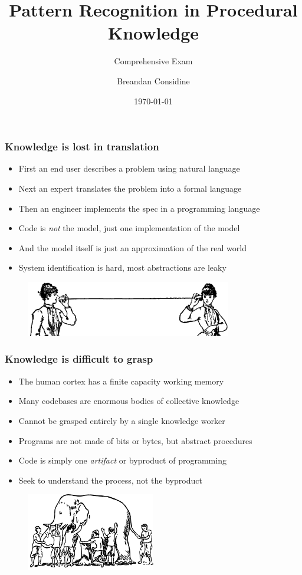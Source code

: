 \documentclass{beamer}
\title{Pattern Recognition in Procedural Knowledge}
\subtitle{Comprehensive Exam}
\author{Breandan Considine}
\institute[McGill]{
McGill University \\
\medskip
\textit{breandan.considine@mcgill.ca}
}
\date{\today}
\begin{document}
\begin{frame}
  \titlepage
\end{frame}

\begin{frame}
  \frametitle{Knowledge is lost in translation}
  \begin{itemize}
    \item First an end user describes a problem using natural language
    \item Next an expert translates the problem into a formal language
    \item Then an engineer implements the spec in a programming language
    \item Code is \textit{not} the model, just one implementation of the model
    \item And the model itself is just an approximation of the real world
    \item System identification is hard, most abstractions are leaky
  \end{itemize}
  \begin{figure}[H]
    \centering
    \includegraphics[width=0.8\textwidth]{../../clipart/tincan.jpg}
  \end{figure}
\end{frame}

\begin{frame}
  \frametitle{Knowledge is difficult to grasp}
  \begin{itemize}
    \item The human cortex has a finite capacity working memory
    \item Many codebases are enormous bodies of collective knowledge
    \item Cannot be grasped entirely by a single knowledge worker
    \item Programs are not made of bits or bytes, but abstract procedures
    \item Code is simply one \textit{artifact} or byproduct of programming
    \item Seek to understand the process, not the byproduct
  \end{itemize}
  \begin{figure}[H]
    \centering
    \includegraphics[width=0.5\textwidth]{../../clipart/elephant.png}
  \end{figure}
\end{frame}
\end{document}
